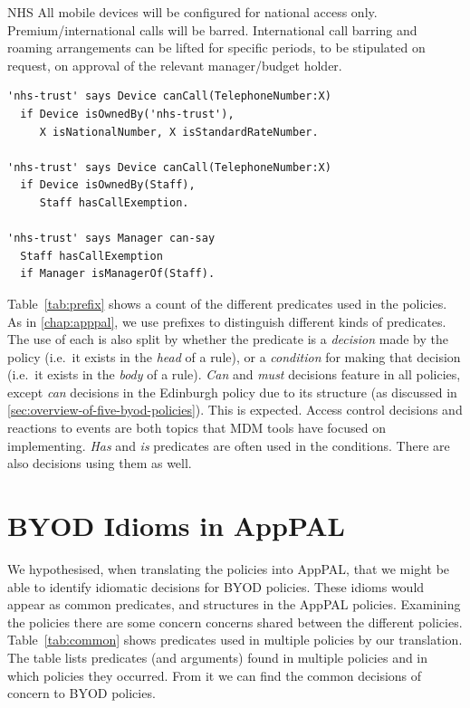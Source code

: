 \documentclass[thesis.tex]{subfiles}
\begin{document}
\noindent\begin{minipage}{\linewidth}\vspace{1em}
\begin{policyrule}{NHS}
  All mobile devices will be configured for national access only. Premium/international calls will be barred.
  International call barring and roaming arrangements can be lifted for specific periods, to be stipulated on request, on approval of the relevant manager/budget holder.
  \normalfont
  \begin{lstlisting}
'nhs-trust' says Device canCall(TelephoneNumber:X)
  if Device isOwnedBy('nhs-trust'),
     X isNationalNumber, X isStandardRateNumber.

'nhs-trust' says Device canCall(TelephoneNumber:X)
  if Device isOwnedBy(Staff),
     Staff hasCallExemption.

'nhs-trust' says Manager can-say
  Staff hasCallExemption
  if Manager isManagerOf(Staff).
  \end{lstlisting}
\end{policyrule}
\end{minipage}

\vspace{1em}
Table~\ref{tab:prefix} shows a count of the different predicates used in the
policies. As in \autoref{chap:apppal}, we use prefixes to distinguish
different kinds of predicates. The use of each is also split by whether the
predicate is a \emph{decision} made by the policy (i.e.~it exists in the \emph{head} of a rule), or a \emph{condition} for
making that decision (i.e.~it exists in the \emph{body} of a rule). \emph{Can} and \emph{must} decisions feature in all
policies, except \emph{can} decisions in the Edinburgh policy due to
its structure (as discussed in
\autoref{sec:overview-of-five-byod-policies}). This is expected.
Access control decisions and reactions to events are both topics that
\ac{MDM} tools have focused on implementing. \emph{Has} and \emph{is} predicates
are often used in the conditions.  There are also decisions using them as well.

\section{BYOD Idioms in AppPAL}
\label{sec:common_concerns}

We hypothesised, when translating the policies into AppPAL, that we might be able to identify idiomatic decisions for BYOD policies.
These idioms would appear as common predicates, and structures in the AppPAL policies.
Examining the policies there are some concern concerns shared between the
different policies. Table~\ref{tab:common} shows predicates used in multiple
policies by our translation. The table lists predicates (and arguments) found in
multiple policies and in which policies they occurred. From it we can find
the common decisions of concern to \ac{BYOD} policies.
\end{document}
